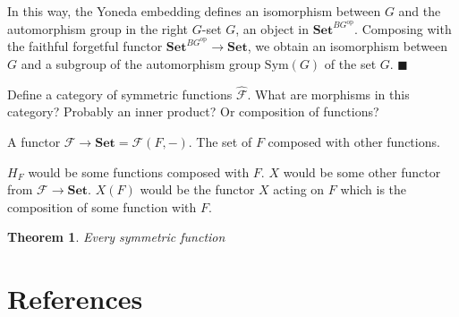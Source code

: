 In this way, the Yoneda embedding defines an isomorphism between $G$ and the automorphism group in the right $G$-set $G$, an object in $\mathbf{Set}^{BG^{\mathrm{op}}}$.  Composing with the faithful forgetful functor $\mathbf{Set}^{BG^{\mathrm{op}}} \rightarrow \mathbf{Set}$, we obtain an isomorphism between $G$ and a subgroup of the automorphism group $\mathrm{Sym}(G)$ of the set $G$.  $\blacksquare$

Define a category of symmetric functions $\hat{\mathcal{F}}$.  What are morphisms in this category?  Probably an inner product?  Or composition of functions?

A functor $\mathcal{F} \rightarrow \mathbf{Set} = \mathcal{F}(F, -)$.  The set of $F$ composed with other functions.  

$H_F$ would be some functions composed with $F$.  $X$ would be some other functor from $\mathcal{F} \rightarrow \mathbf{Set}$.  $X(F)$ would be the functor $X$ acting on $F$ which is the composition of some function with $F$. 

\newtheorem{thm}{Theorem}
\begin{thm}
	Every symmetric function
\end{thm}

\section*{References}
 \smiley \\ \vspace*{0.4cm}

 
